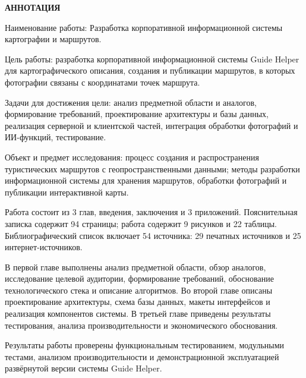 \thispagestyle{empty}
{\centering\bfseries АННОТАЦИЯ\par}

\vspace{4pt}

\indent Наименование работы: Разработка корпоративной информационной системы
картографии и маршрутов.

Цель работы: разработка корпоративной информационной системы Guide Helper для
картографического описания, создания и публикации маршрутов, в которых
фотографии связаны с координатами точек маршрута.

Задачи для достижения цели: анализ предметной области и аналогов, формирование
требований, проектирование архитектуры и базы данных, реализация серверной и
клиентской частей, интеграция обработки фотографий и ИИ-функций, тестирование.

Объект и предмет исследования: процесс создания и распространения туристических
маршрутов с геопространственными данными; методы разработки информационной
системы для хранения маршрутов, обработки фотографий и публикации интерактивной
карты.

Работа состоит из 3 глав, введения, заключения и 3 приложений. Пояснительная
записка содержит 94 страницы; работа содержит 9 рисунков и 22 таблицы. Библиографический
список включает 54 источника: 29 печатных источников и 25 интернет-источников.

В первой главе выполнены анализ предметной области, обзор аналогов,
исследование целевой аудитории, формирование требований, обоснование
технологического стека и описание алгоритмов. Во второй главе описаны
проектирование архитектуры, схема базы данных, макеты интерфейсов и реализация
компонентов системы. В третьей главе приведены результаты тестирования, анализа
производительности и экономического обоснования.

Результаты работы проверены функциональным тестированием, модульными тестами,
анализом производительности и демонстрационной эксплуатацией развёрнутой версии
системы Guide Helper.
